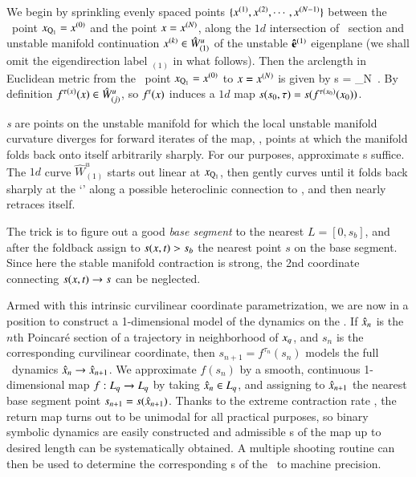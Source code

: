 \documentclass[preprint,number,sort&compress]{elsarticle}
\begin{document}
We begin by sprinkling evenly spaced points
$\{x^{(1)},x^{(2)},\cdots,x^{(N-1)}\}$ between the
\reqv\ point $x_{\mathrm{Q}_{1}}=x^{(0)}$ and the point
$x= x^{(N)}$, along the $1d$ intersection of \Poincare\
section and unstable manifold continuation $x^{(k)} \in
\hat{W}^u_{(1)}$ of the unstable ${\bf \hat{e}}^{(1)}$
eigen\-plane (we shall omit the eigen\-direction label
${}_{(1)}$ in what follows). Then the arclength in Euclidean
metric from the
\reqv\ point $x_{\mathrm{Q}_{1}}=x^{(0)}$ to $x=
x^{(N)}$ is given by
\beq
s = \lim_{N\to\infty}
\,.
By definition $f^{\tau(x)}(x) \in \hat{W}^u_{(j)}$, so
$f^t(x)$ induces a $1d$ map $s(s_0,\tau) =
s(f^{\tau({x_0})}({x_0}))$.

{\em \Turn s} are points on the unstable manifold for which
the local unstable manifold curvature diverges for forward
iterates of the map, \ie, points at which the manifold folds
back onto itself arbitrarily sharply. For our purposes,
approximate \turn s suffice. The $1d$ curve $\hat{W}^u_{(1)}$
starts out linear at $x_{\mathrm{Q}_{1}}$, then gently curves
until it folds back sharply at the `\turn' along a possible
heteroclinic connection to , and then nearly retraces
itself.

The trick is to figure out a good {\em base segment} to the
nearest {\turn} $L=[0,s_{b}]$, and after the foldback assign
to $s(x,t)>s_{b}$ the nearest point $s$ on the base
segment. Since here the stable manifold contraction is strong, the
2nd coordinate connecting $s(x,t) \to s$ can be neglected.

Armed with this intrinsic curvilinear coordinate
parametrization, we are now in a position to construct a
1-dimensional model of the dynamics on the \nws. If
$\hat{x}_n$ is the $n$th Poincar\'e section of a
trajectory in neighborhood of $x_q$, and $s_n$ is the
corresponding curvilinear coordinate, then $s_{n+1} =
f^{\tau_n}(s_n)$ models the full \statesp\ dynamics
$\hat{x}_n \to \hat{x}_{n+1}$. We approximate $f(s_n)$
by a smooth, continuous 1-dimensional map $f : L_q \to
L_q$ by taking $\hat{x}_n \in L_q$, and
assigning to $\hat{x}_{n+1}$ the nearest base segment
point $s_{n+1}=s(\hat{x}_{n+1})$. Thanks to the extreme
contraction rate , the return map turns out to
be unimodal for all practical purposes, so binary symbolic dynamics are easily
constructed and admissible \po s of the map up to desired length can be
systematically obtained. A multiple shooting routine\rf{DasBuch} can then be
used to determine the corresponding \rpo s
of the \cLe\ to machine precision.
\end{document}
